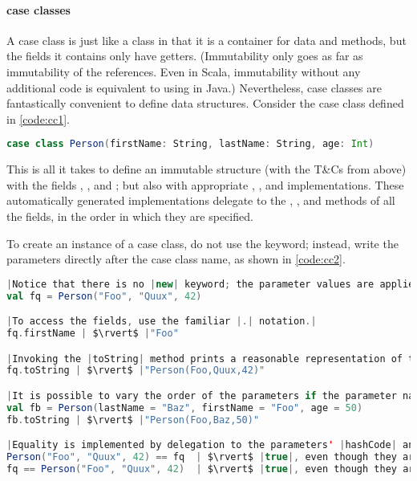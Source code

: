 \documentclass[10 pt]{article}
\begin{document}
\paragraph{case classes} A case class is just like a class in that it is a container for data and methods, but the fields it contains only have getters. (Immutability only goes as far as immutability of the references. Even in Scala, immutability without any additional code is equivalent to using  in Java.) Nevertheless, case classes are fantastically convenient to define data structures. Consider the  case class defined in \autoref{code:cc1}.

\begin{lstlisting}[caption={Case class \pcode{Person}}, label={code:cc1}, language=Scala, escapechar=|]
case class Person(firstName: String, lastName: String, age: Int)
\end{lstlisting}

This is all it takes to define an immutable structure (with the T\&Cs from above) with the fields , , and ; but also with appropriate , , and  implementations. These automatically generated implementations delegate to the , , and  methods of all the fields, in the order in which they are specified.

To create an instance of a case class, do not use the  keyword; instead, write the parameters directly after the case class name, as shown in \autoref{code:cc2}.

\begin{lstlisting}[caption={Using case class \pcode{Person}}, label={code:cc2}, language=Scala, escapechar=|]
|Notice that there is no |new| keyword; the parameter values are applied directly after the case class name.|
val fq = Person("Foo", "Quux", 42)

|To access the fields, use the familiar |.| notation.|
fq.firstName | $\rvert$ |"Foo"

|Invoking the |toString| method prints a reasonable representation of the case class.|
fq.toString | $\rvert$ |"Person(Foo,Quux,42)"

|It is possible to vary the order of the parameters if the parameter names are also specified. This can help readability.|
val fb = Person(lastName = "Baz", firstName = "Foo", age = 50)
fb.toString | $\rvert$ |"Person(Foo,Baz,50)"

|Equality is implemented by delegation to the parameters' |hashCode| and |equals| methods.|
Person("Foo", "Quux", 42) == fq  | $\rvert$ |true|, even though they are \emph{different} instances.|
fq == Person("Foo", "Quux", 42)  | $\rvert$ |true|, even though they are \emph{different} instances.|
\end{lstlisting}
\end{document}

